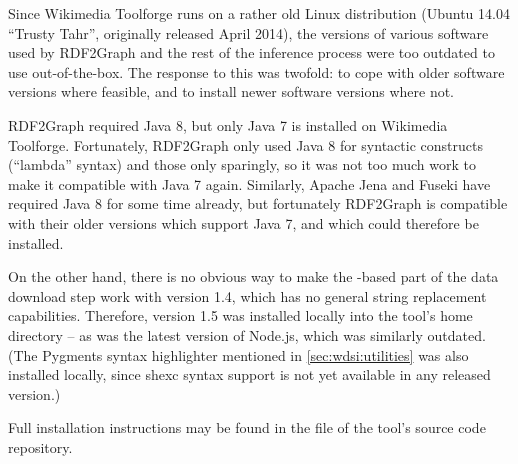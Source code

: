 Since \gls{Wikimedia Toolforge} runs on a rather old Linux distribution
(Ubuntu 14.04 “Trusty Tahr”, originally released April 2014),
the versions of various software used by \gls{RDF2Graph} and the rest of the inference process
were too outdated to use out-of-the-box.
The response to this was twofold:
to cope with older software versions where feasible,
and to install newer software versions where not.

\Gls{RDF2Graph} required \gls{Java} 8,
but only \gls{Java} 7 is installed on \gls{Wikimedia Toolforge}.
Fortunately, \gls{RDF2Graph} only used \gls{Java} 8 for syntactic constructs (“lambda” syntax)
and those only sparingly, so it was not too much work to make it compatible with \gls{Java} 7 again.
Similarly, Apache Jena and Fuseki have required \gls{Java} 8 for some time already,
but fortunately \gls{RDF2Graph} is compatible with their older versions which support \gls{Java} 7,
and which could therefore be installed.

On the other hand, there is no obvious way to make the -based part of the data download step
work with  version 1.4, which has no general string replacement capabilities.
Therefore,  version 1.5 was installed locally into the tool’s home directory –
as was the latest version of \gls{Node.js}, which was similarly outdated.
(The Pygments syntax highlighter mentioned in \cref{sec:wdsi:utilities} was also installed locally,
since \gls{shexc} syntax support is not yet available in any released version.)

Full installation instructions may be found in the  file
of the tool’s source code repository.
